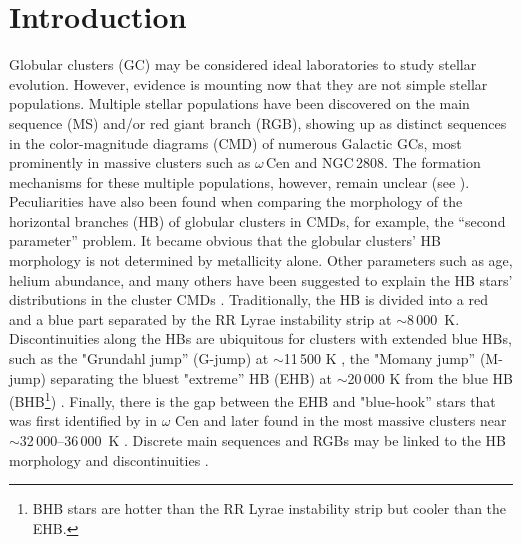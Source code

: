 \documentclass{aa}
\begin{document}
        
        

\maketitle


\section{Introduction}\label{Introduction}

Globular clusters (GC) may be considered ideal laboratories to study stellar evolution. However, evidence is mounting now that they are not simple stellar populations. Multiple stellar populations have been discovered on the main sequence (MS) and/or red giant branch
(RGB), showing up as distinct sequences in the color-magnitude diagrams (CMD) of numerous Galactic GCs, most prominently in massive clusters such as $\omega$\,Cen and NGC\,2808.
The formation mechanisms for these multiple
populations, however, remain unclear (see \citealt{renzini2015,Bastian2018}).
Peculiarities have also been found when comparing the morphology of the horizontal branches (HB) of globular clusters in CMDs, for example, the “second
parameter” problem. It became obvious that the globular clusters' HB morphology is not determined by metallicity alone. Other parameters such as age, helium abundance, and many others have been suggested to explain the HB stars' distributions in the cluster CMDs \citep[see, e.g.][]{recio2006,moehler01,catelan09,Miocchi2007,dotter2010}.
Traditionally, the HB is divided into a red and a blue part separated by the RR Lyrae instability strip at $\sim$8\,000~K.
Discontinuities along the HBs are ubiquitous for clusters with extended blue HBs, such as the "Grundahl jump'' (G-jump)
 at $\sim$11\,500 K \citep{grundahl99}, the "Momany jump'' (M-jump) separating the bluest "extreme'' HB (EHB) at $\sim$20\,000 K from the blue HB (BHB\footnote{BHB stars are hotter than the RR Lyrae instability strip but cooler than the EHB.})
 \citep{momany02,newell73,newell76}. Finally, there is the gap between the EHB and "blue-hook'' stars that was first identified by \citet{2000ApJ...530..352D} in $\omega$ Cen and later found 
in the most massive clusters near $\sim$32\,000–36\,000~K \citep{2010ApJ...718.1332B,2010MmSAI..81..838M}.
Discrete main sequences and RGBs may be linked to the HB morphology and discontinuities \citep{2008ASPC..392....3Y}. 
\end{document}
